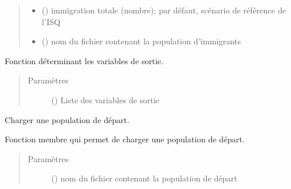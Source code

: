 \documentclass[letterpaper,10pt,french]{sphinxmanual}
\begin{document}
\begin{fulllineitems}
\begin{fulllineitems}
\begin{quote}
\begin{description}
\begin{itemize}
\item {} 
 () \textendash{} immigration totale (nombre); par défaut, scénario de référence de l’ISQ

\item {} 
 () \textendash{} nom du fichier contenant la population d’immigrants

\end{itemize}

\end{description}\end{quote}

\end{fulllineitems}


\begin{fulllineitems}
\label{\detokenize{code:simgen.model.set_statistics}}
Fonction déterminant les variables de sortie.
\begin{quote}\begin{description}
\item[{Paramètres}] \leavevmode
{} () \textendash{} Liste des variables de sortie

\end{description}\end{quote}

\end{fulllineitems}


\begin{fulllineitems}
\label{\detokenize{code:simgen.model.startpop}}
Charger une population de départ.

Fonction membre qui permet de charger une population de départ.
\begin{quote}\begin{description}
\item[{Paramètres}] \leavevmode
{} () \textendash{} nom du fichier contenant la population de départ

\end{description}\end{quote}

\end{fulllineitems}


\end{fulllineitems}
\end{document}
